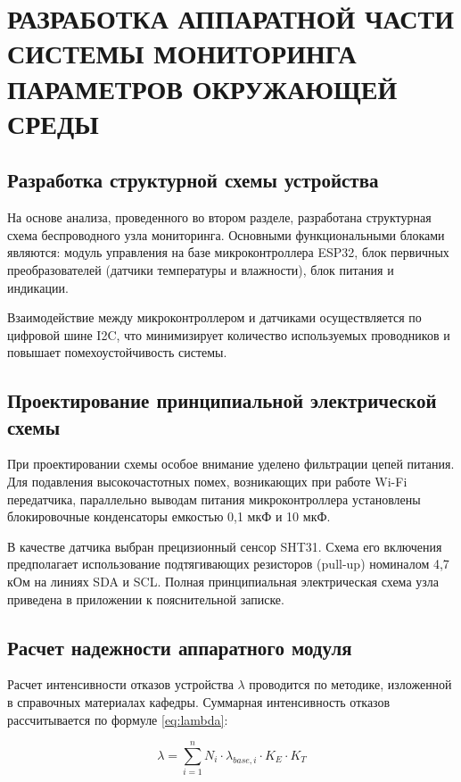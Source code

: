 \chapter{РАЗРАБОТКА АППАРАТНОЙ ЧАСТИ СИСТЕМЫ МОНИТОРИНГА ПАРАМЕТРОВ ОКРУЖАЮЩЕЙ СРЕДЫ}

\section{Разработка структурной схемы устройства}

На основе анализа, проведенного во втором разделе, разработана структурная схема беспроводного узла мониторинга. Основными функциональными блоками являются: модуль управления на базе микроконтроллера ESP32, блок первичных преобразователей (датчики температуры и влажности), блок питания и индикации.

Взаимодействие между микроконтроллером и датчиками осуществляется по цифровой шине I2C, что минимизирует количество используемых проводников и повышает помехоустойчивость системы.

\section{Проектирование принципиальной электрической схемы}

При проектировании схемы особое внимание уделено фильтрации цепей питания. Для подавления высокочастотных помех, возникающих при работе Wi-Fi передатчика, параллельно выводам питания микроконтроллера установлены блокировочные конденсаторы емкостью 0,1 мкФ и 10 мкФ.

В качестве датчика выбран прецизионный сенсор SHT31. Схема его включения предполагает использование подтягивающих резисторов (pull-up) номиналом 4,7 кОм на линиях SDA и SCL. Полная принципиальная электрическая схема узла приведена в приложении к пояснительной записке.

\section{Расчет надежности аппаратного модуля}

Расчет интенсивности отказов устройства $\lambda$ проводится по методике, изложенной в справочных материалах кафедры. Суммарная интенсивность отказов рассчитывается по формуле \eqref{eq:lambda}:

\begin{equation}
    \lambda = \sum_{i=1}^{n} N_i \cdot \lambda_{base, i} \cdot K_E \cdot K_T
    \label{eq:lambda}
\end{equation}

